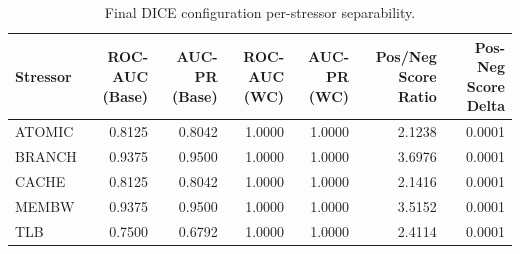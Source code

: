 \begin{table}[t]
\centering
\caption{Final DICE configuration per-stressor separability.}
\label{tab:dice_full_stressor}
\footnotesize
\begin{tabular}{lrrrrrr}
\toprule
Stressor & ROC-AUC (Base) & AUC-PR (Base) & ROC-AUC (WC) & AUC-PR (WC) & Pos/Neg Score Ratio & Pos-Neg Score Delta \\
\midrule
ATOMIC & 0.8125 & 0.8042 & 1.0000 & 1.0000 & 2.1238 & 0.0001 \\
BRANCH & 0.9375 & 0.9500 & 1.0000 & 1.0000 & 3.6976 & 0.0001 \\
CACHE & 0.8125 & 0.8042 & 1.0000 & 1.0000 & 2.1416 & 0.0001 \\
MEMBW & 0.9375 & 0.9500 & 1.0000 & 1.0000 & 3.5152 & 0.0001 \\
TLB & 0.7500 & 0.6792 & 1.0000 & 1.0000 & 2.4114 & 0.0001 \\
\bottomrule
\end{tabular}

\end{table}
